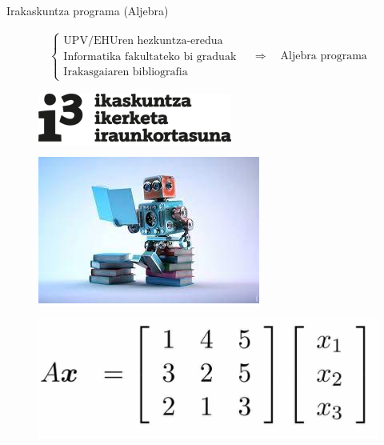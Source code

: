 \documentclass[
 10pt,%
 compress,%
 t,       %
 xcolor=svgnames
]{beamer}
\theoremstyle{definition} \newtheorem{definicion}{Definicion}[section]
\theoremstyle{propiedades} \newtheorem{propiedades}{Propiedades}[section]
\begin{document}

\begin{frame}{Irakaskuntza programa (Aljebra)} 

\medskip
\small



\begin{align*}
%
\begin{cases}
\text{UPV/EHUren hezkuntza-eredua} \\
\text{Informatika fakultateko bi graduak} \\
\text{Irakasgaiaren bibliografia}
\end{cases}
%
\quad \Rightarrow \quad 
\text{Aljebra programa}
%
\end{align*}


%
\bigskip


\begin{figure}
%
\begin{minipage}{.3\textwidth}
\colorbox{white}  {\includegraphics[width=0.8\linewidth]{IKDi3}}
\end{minipage}
%
\begin{minipage}{.3\textwidth}
\colorbox{white}  {\includegraphics[width=0.8\linewidth]{Adimen Artifiziala}}
\end{minipage}
%
\begin{minipage}{.3\textwidth}
\colorbox{white}  {\includegraphics[width=0.8\linewidth]{ProgAlgebra}}
\end{minipage}
%
\end{figure}



\end{frame}
\end{document}
